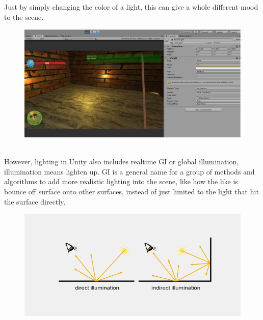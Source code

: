 \documentclass[a4paper, 13pt]{extarticle}
\begin{document}
{\begin{figure}[h]
{\begin{minipage}{.45\textwidth}
			\centering
			\label{fig:test27}
		\end{minipage}
	}
\end{figure}
  \vspace{5.5cm}
  Just by simply changing the color of a light, this can give a whole different mood to the scene.
  \begin{figure}[h]
  	\begin{minipage}{1\textwidth}
  		\centering
  		\includegraphics[width=0.8\linewidth]{intructions/change_light_color.png}
  		\centering
  		\label{fig:test28}
  	\end{minipage}
  \end{figure} \\
 However, lighting in Unity also includes realtime GI or global illumination, illumination means lighten up. GI is a general name for a group of methods and algorithms to add more realistic lighting into the scene, like how the like is bounce off surface onto other surfaces, instead of just limited to the light that hit the surface directly. 
 \begin{figure}[h]
 	\begin{minipage}{1\textwidth}
 		\centering
 		\includegraphics[width=0.8\linewidth]{intructions/light_categlories.png}
 		\centering
 		\end{minipage}
 	\end{figure}
 \\[0.05cm]
}
\end{document}
